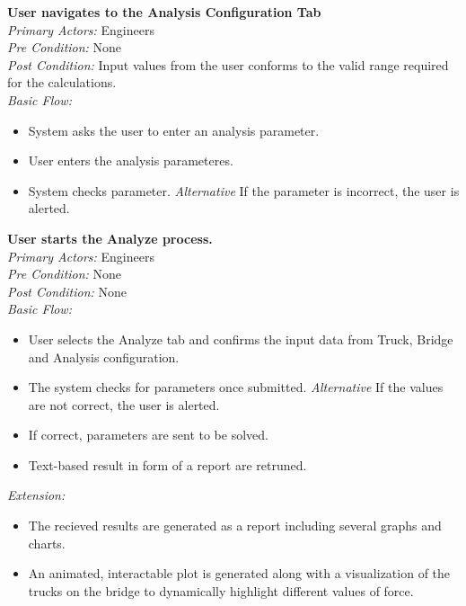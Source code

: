 \documentclass[12pt]{article}
\begin{document}
\noindent
\textbf{User navigates to the Analysis Configuration Tab} \\
\emph{  Primary Actors:} Engineers\\
\emph{  Pre Condition:} None\\
\emph{  Post Condition:} Input values from the user conforms to the valid range required for the calculations.\\ 
\emph{  Basic Flow:} 
\begin{itemize}
\item System asks the user to enter an analysis parameter. 
\item User enters the analysis parameteres. 
\item System checks parameter.
\subitem \emph{Alternative} If the parameter is incorrect, the user is alerted.
\end{itemize}


\noindent
\textbf{User starts the Analyze process. } \\
\emph{  Primary Actors:} Engineers\\
\emph{  Pre Condition:} None\\
\emph{  Post Condition:} None\\ 
\emph{  Basic Flow:} 
\begin{itemize}
\item User selects the Analyze tab and confirms the input data from Truck, Bridge and Analysis configuration. 
\item The system checks for parameters once submitted.
\subitem \emph{Alternative} If the values are not correct, the user is alerted.
\item If correct, parameters are sent to be solved. 
\item Text-based result in form of a report are retruned.
\end{itemize}
\emph{  Extension:} 
\begin{itemize}
\item The recieved results are generated as a report including several graphs and charts.
\item An animated, interactable plot is generated along with a visualization of the trucks on the bridge to dynamically highlight different values of force.
\end{itemize}
\end{document}
